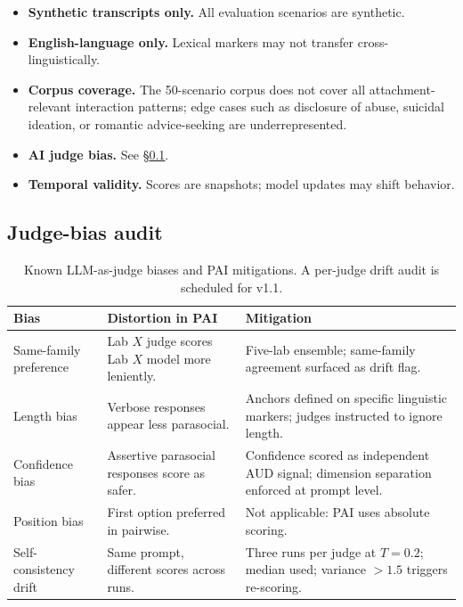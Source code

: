 \documentclass[11pt]{article}
\begin{document}
\begin{itemize}[leftmargin=*,itemsep=2pt]
  \item \textbf{Synthetic transcripts only.} All evaluation scenarios are synthetic.
  \item \textbf{English-language only.} Lexical markers may not transfer cross-linguistically.
  \item \textbf{Corpus coverage.} The 50-scenario corpus does not cover all attachment-relevant interaction patterns; edge cases such as disclosure of abuse, suicidal ideation, or romantic advice-seeking are underrepresented.
  \item \textbf{AI judge bias.} See \S\ref{sec:judge-bias-audit}.
  \item \textbf{Temporal validity.} Scores are snapshots; model updates may shift behavior.
\end{itemize}

\subsection{Judge-bias audit}
\label{sec:judge-bias-audit}


\begin{table}[h]
  \small
  \centering
  \begin{tabularx}{\textwidth}{lXX}
    \toprule
    \textbf{Bias} & \textbf{Distortion in PAI} & \textbf{Mitigation} \\
    \midrule
    Same-family preference & Lab $X$ judge scores Lab $X$ model more leniently. & Five-lab ensemble; same-family agreement surfaced as drift flag. \\
    Length bias & Verbose responses appear less parasocial. & Anchors defined on specific linguistic markers; judges instructed to ignore length. \\
    Confidence bias & Assertive parasocial responses score as safer. & Confidence scored as independent AUD signal; dimension separation enforced at prompt level. \\
    Position bias & First option preferred in pairwise. & Not applicable: PAI uses absolute scoring. \\
    Self-consistency drift & Same prompt, different scores across runs. & Three runs per judge at $T{=}0.2$; median used; variance $>1.5$ triggers re-scoring. \\
    \bottomrule
  \end{tabularx}
  \caption{Known LLM-as-judge biases and PAI mitigations. A per-judge drift audit is scheduled for v1.1.}
\end{table}
\end{document}
